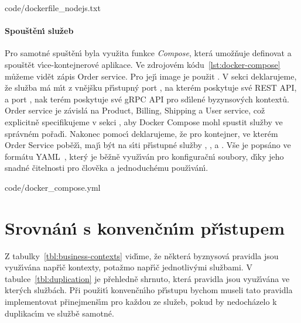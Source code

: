 
{code/dockerfile_nodejs.txt}

\paragraph{Spouštěn\'{\i} služeb}
Pro samotné spuštěn\'{\i} byla využita funkce \textit{Compose}, která umožňuje
definovat a spouštět v\'{\i}ce-kontejnerové aplikace. Ve zdrojovém kódu~\ref{lst:docker-compose}
můžeme vidět zápis Order service. Pro jej\'{\i} image je použit .
V sekci  deklarujeme, že služba má m\'{\i}t z vnějšku př\'{\i}stupn\'y port , na kterém poskytuje své
\gls{REST} \gls{API}, a port , nak terém poskytuje své gRPC \gls{API} pro sd\'{\i}lené byzynsov\'ych kontextů. Order service je závislá
na Product, Billing, Shipping a User service, což explicitně specifikujeme v sekci ,
aby Docker Compose mohl spustit služby ve správném pořad\'{\i}. Nakonec pomoc\'{\i}  deklarujeme,
že pro kontejner, ve kterém Order Service poběž\'{\i}, maj\'{\i} b\'yt na s\'{\i}ti př\'{\i}stupné služby , ,
 a . Vše je popsáno ve formátu \gls{YAML}~\cite{ben2005yaml}, kter\'y je běžně využ\'{\i}ván
pro konfiguračn\'{\i} soubory, d\'{\i}ky jeho snadné čitelnosti pro člověka a jednoduchému použ\'{\i}ván\'{\i}.


{code/docker_compose.yml}

\section{Srovnán\'{\i} s konvenčn\'{\i}m př\'{\i}stupem}

Z tabulky~\ref{tbl:business-contexts} vid\'{\i}me, že některá byznysová pravidla jsou
využ\'{\i}vána např\'{\i}č kontexty, potažmo např\'{\i}č jednotliv\'ymi službami. V tabulce~\ref{tbl:duplication}
je přehledně shrnuto, která pravidla jsou využ\'{\i}vána ve kter\'ych službách.
Při použit\'{\i} konvenčn\'{\i}ho př\'{\i}stupu bychom museli tato pravidla implementovat přinejmenš\'{\i}m
pro každou ze služeb, pokud by nedocházelo k duplikac\'{\i}m ve službě samotné.

